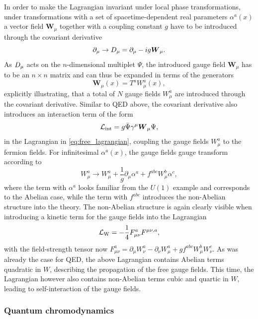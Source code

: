 In order to make the Lagrangian invariant under local phase transformations, \ie under transformations with a set of spacetime-dependent real parameters $\alpha^a(x)$ a vector field $\boldsymbol{W}_\mu$ together with a coupling constant $g$ have to be introduced through the covariant derivative  
\begin{equation}
	\partial_\mu \rightarrow \mathop{}\!D_\mu = \partial_\mu - ig\boldsymbol{W}_\mu.
\end{equation}
As $\mathop{}\!D_\mu$ acts on the $n$-dimensional multiplet $\Psi$, the introduced gauge field $\boldsymbol{W}_\mu$ has to be an $n\times n$ matrix and can thus be expanded in terms of the generators
\begin{equation}
	\boldsymbol{W}_\mu(x) = T^a W_\mu^a(x),
\end{equation}
explicitly illustrating, that a total of $N$ gauge fields $W^a_\mu$ are introduced through the covariant derivative. Similar to QED above, the covariant derivative also introduces an interaction term of the form
\begin{equation}
	\mathcal{L}_\mathrm{int} = g\bar{\Psi}\gamma^\mu\boldsymbol{W}_\mu\Psi,
\end{equation}
in the Lagrangian in \cref{eq:free_lagrangian}, coupling the gauge fields $W^a_\mu$ to the fermion fields. For infinitesimal $\alpha^a(x)$, the gauge fields gauge transform according to
\begin{equation}
	W_\mu^a \rightarrow W_\mu^a + \frac{1}{g}\partial_\mu\alpha^a + f^{abc} W_\mu^b \alpha^c,
\end{equation}
where the term with $\alpha^a$ looks familiar from the $U(1)$ example and corresponds to the Abelian case, while the term with $f^{abc}$ introduces the non-Abelian structure into the theory. The non-Abelian structure is again clearly visible when introducing a kinetic term for the gauge fields into the Lagrangian
\begin{equation}
	\mathcal{L}_\mathrm{W} = -\frac{1}{4} F^a_{\mu\nu} F^{\mu\nu,a},
\end{equation} 
with the field-strength tensor now $F^a_{\mu\nu} = \partial_\mu W^a_\nu - \partial_\nu W^a_\mu + gf^{abc}W^b_\mu W^c_\nu$. As was already the case for QED, the above Lagrangian contains Abelian terms quadratic in $W$, describing the propagation of the free gauge fields. This time, the Lagrangian however also contains non-Abelian terms cubic and quartic in $W$, leading to self-interaction of the gauge fields.

\subsubsection{Quantum chromodynamics}

